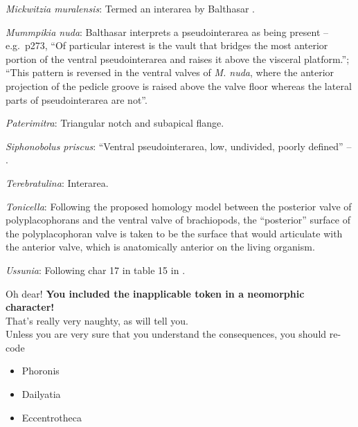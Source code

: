 \documentclass[openany]{book}
\providecommand{\tightlist}{%
  \setlength{\itemsep}{0pt}\setlength{\parskip}{0pt}}
\theoremstyle{definition}
\theoremstyle{definition}
\theoremstyle{definition}
\theoremstyle{remark}
\begin{document}
\hypertarget{Mickwitzia_muralensis-coding-89}{}
\emph{Mickwitzia muralensis}: Termed an interarea by Balthasar
\citeyearpar{Balthasar2004Shellstructure}.

\hypertarget{Mummpikia_nuda-coding-89}{}
\emph{Mummpikia nuda}: Balthasar \citeyearpar{Balthasar2008iMummpikia}
interprets a pseudointerarea as being present -- e.g.~p273, ``Of
particular interest is the vault that bridges the most anterior portion
of the ventral pseudointerarea and raises it above the visceral
platform.''; ``This pattern is reversed in the ventral valves of
\emph{M. nuda}, where the anterior projection of the pedicle groove is
raised above the valve floor whereas the lateral parts of
pseudointerarea are not''.

\hypertarget{Paterimitra-coding-89}{}
\emph{Paterimitra}: Triangular notch and subapical flange.

\hypertarget{Siphonobolus_priscus-coding-89}{}
\emph{Siphonobolus priscus}: ``Ventral pseudointerarea, low, undivided,
poorly defined'' -- \citet{Williams2000LinguliformeaCraniiformea}.

\hypertarget{Terebratulina-coding-89}{}
\emph{Terebratulina}: Interarea.

\hypertarget{Tonicella-coding-89}{}
\emph{Tonicella}: Following the proposed homology model between the
posterior valve of polyplacophorans and the ventral valve of
brachiopods, the ``posterior'' surface of the polyplacophoran valve is
taken to be the surface that would articulate with the anterior valve,
which is anatomically anterior on the living organism.

\hypertarget{Ussunia-coding-89}{}
\emph{Ussunia}: Following char 17 in table 15 in
\citet{Williams2000LinguliformeaCraniiformea}.

Oh dear! \textbf{You included the inapplicable token in a neomorphic
character!}\\
That's really very naughty, as \citet{Brazeau2018} will tell you.\\
Unless you are very sure that you understand the consequences, you
should re-code

\begin{itemize}
\tightlist
\item
  Phoronis\\
\item
  Dailyatia\\
\item
  Eccentrotheca
\end{itemize}
\end{document}

